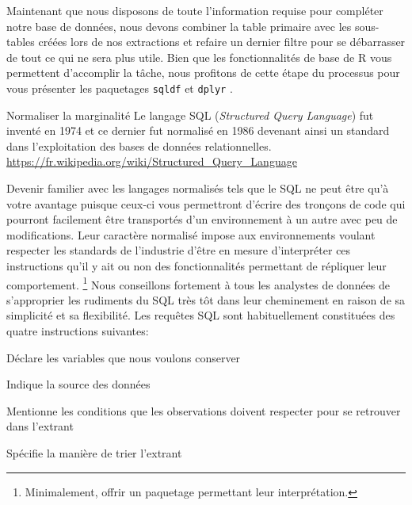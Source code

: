 \vspace{\baselineskip}
Maintenant que nous disposons de toute l'information requise pour compléter notre base de données, nous devons combiner la table primaire avec les sous-tables créées lors de nos extractions et refaire un dernier filtre pour se débarrasser de tout ce qui ne sera plus utile. Bien que les fonctionnalités de base de R vous permettent d'accomplir la tâche, nous profitons de cette étape du processus pour vous présenter les paquetages \texttt{sqldf} \cite{pkgR:sqldf} et \texttt{dplyr} \cite{pkgR:plyr}. \\

\begin{moreInfo}{Normaliser la marginalité}
	Le langage SQL (\emph{Structured Query Language}) fut inventé en 1974 et ce dernier fut normalisé en 1986 devenant ainsi un standard dans l'exploitation des bases de données relationnelles. \\
	\url{https://fr.wikipedia.org/wiki/Structured_Query_Language}
\end{moreInfo}

Devenir familier avec les langages normalisés tels que le SQL ne peut être qu'à votre avantage puisque ceux-ci vous permettront d'écrire des tronçons de code qui pourront facilement être transportés d'un environnement à un autre avec peu de modifications. Leur caractère normalisé impose aux environnements voulant respecter les standards de l'industrie d'être en mesure d'interpréter ces instructions qu'il y ait ou non des fonctionnalités permettant de répliquer leur comportement. \footnote{Minimalement, offrir un paquetage permettant leur interprétation.} \cite{SQL} Nous conseillons fortement à tous les analystes de données de s'approprier les rudiments du SQL très tôt dans leur cheminement en raison de sa simplicité et sa flexibilité. Les requêtes SQL sont habituellement constituées des quatre instructions suivantes: \\

\begin{description}[style=multiline,leftmargin=2cm]
	\item[Select] Déclare les variables que nous voulons conserver
	\item[From] Indique la source des données
	\item[Where] Mentionne les conditions que les observations doivent respecter pour se retrouver dans l'extrant
	\item[Order by] Spécifie la manière de trier l'extrant
\end{description}

